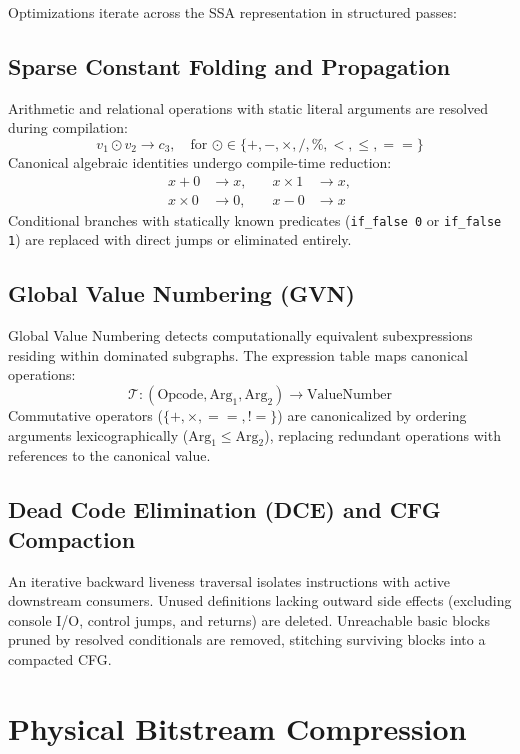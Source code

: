 \documentclass{ieeeaccess}
\begin{document}
Optimizations iterate across the SSA representation in structured passes:

\subsection{Sparse Constant Folding and Propagation}
Arithmetic and relational operations with static literal arguments are resolved during compilation:
\begin{equation}
v_1 \odot v_2 \longrightarrow c_3, \quad \text{for } \odot \in \{+, -, \times, /, \%, <, \le, ==\}
\end{equation}
Canonical algebraic identities undergo compile-time reduction:
\begin{align*}
x + 0 &\to x, \quad &x \times 1 &\to x, \\
x \times 0 &\to 0, \quad &x - 0 &\to x
\end{align*}
Conditional branches with statically known predicates (\texttt{if\_false 0} or \texttt{if\_false 1}) are replaced with direct jumps or eliminated entirely.

\subsection{Global Value Numbering (GVN)}
Global Value Numbering detects computationally equivalent subexpressions residing within dominated subgraphs. The expression table maps canonical operations:
\begin{equation}
\mathcal{T}: (\text{Opcode}, \text{Arg}_1, \text{Arg}_2) \longrightarrow \text{ValueNumber}
\end{equation}
Commutative operators ($\{+, \times, ==, !=\}$) are canonicalized by ordering arguments lexicographically ($\text{Arg}_1 \le \text{Arg}_2$), replacing redundant operations with references to the canonical value.

\subsection{Dead Code Elimination (DCE) and CFG Compaction}
An iterative backward liveness traversal isolates instructions with active downstream consumers. Unused definitions lacking outward side effects (excluding console I/O, control jumps, and returns) are deleted. Unreachable basic blocks pruned by resolved conditionals are removed, stitching surviving blocks into a compacted CFG.

\section{Physical Bitstream Compression}
\label{sec:compression} %
\end{document}
